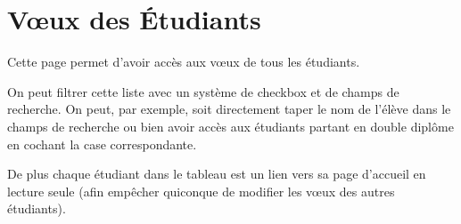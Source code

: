 \section{Vœux des Étudiants}
\label{sec::stud_wish}
Cette page permet d'avoir accès aux vœux de tous les étudiants.

On peut filtrer cette liste avec un système de checkbox et de champs de recherche. On peut, par exemple, soit directement taper le nom de l'élève dans le champs de recherche ou bien avoir accès aux étudiants partant en double diplôme en cochant la case correspondante.

De plus chaque étudiant dans le tableau est un lien vers sa page d'accueil en lecture seule (afin empêcher quiconque de modifier les vœux des autres étudiants).